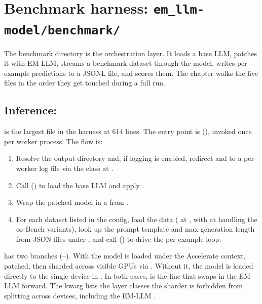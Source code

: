 \section{Benchmark harness: \texttt{em\_llm-model/benchmark/}}
\label{sec:benchmark}

The benchmark directory is the orchestration layer. It loads a base LLM, patches it with EM-LLM, streams a benchmark dataset through the model, writes per-example predictions to a JSONL file, and scores them. The chapter walks the five files in the order they get touched during a full run.

\subsection{Inference: }
\label{sec:bench-pred}

 is the largest file in the harness at 614 lines. The entry point is  (), invoked once per worker process. The flow is:
\begin{enumerate}
  \item Resolve the output directory and, if logging is enabled, redirect  and  to a per-worker log file via the  class at .
  \item Call  () to load the base LLM and apply .
  \item Wrap the patched model in a  from .
  \item For each dataset listed in the config, load the data ( at , with  at  handling the $\infty$-Bench variants), look up the prompt template and max-generation length from JSON files under , and call  () to drive the per-example loop.
\end{enumerate}

 has two branches (--). With  the model is loaded under the Accelerate  context, patched, then sharded across visible GPUs via . Without it, the model is loaded directly to the single device in . In both cases,  is the line that swaps in the EM-LLM forward. The  kwarg lists the layer classes the sharder is forbidden from splitting across devices, including the EM-LLM .


